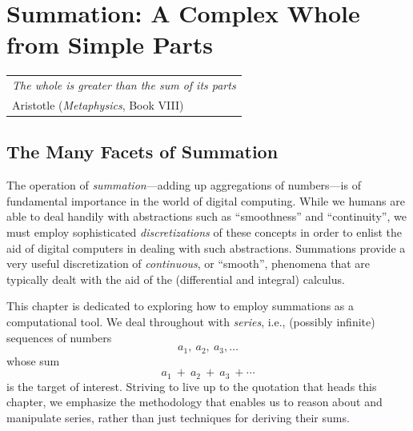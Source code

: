 
\chapter{Summation:
A Complex Whole from Simple Parts}
\label{ch:Summation}

\hfill
\begin{tabular}{l}
{\em The whole is greater than the sum of its parts} \\
\hfill {\small Aristotle ({\it Metaphysics}, Book VIII)}
\end{tabular}


\vspace*{.5in}

\section{The Many Facets of Summation}
\label{sec:intro}

The operation of {\it summation}---adding up aggregations of numbers---is of fundamental importance in the world of digital computing.  While we humans are able to deal handily with abstractions such as ``smoothness'' and ``continuity'', we must employ sophisticated {\em discretizations} of these concepts in order to enlist the aid of digital computers in dealing with such abstractions.  Summations provide a very useful discretization of {\em continuous}, or
``smooth'', phenomena that are typically dealt with the aid of the (differential and integral) calculus.

\medskip

This chapter is dedicated to exploring how to employ summations as a computational tool.  We deal throughout with {\it series}, i.e., (possibly infinite) sequences of numbers
\[ a_1, \ a_2, \ a_3, \ldots \]
whose sum
\begin{equation}
\label{eq:abstract-sum}
a_1 \ + \ a_2 \ + \ a_3 \ + \cdots
\end{equation}
is the target of interest.  Striving to live up to the quotation that heads this chapter, we emphasize the methodology that enables us to reason about and manipulate series, rather than just techniques for deriving their sums.

\medskip

